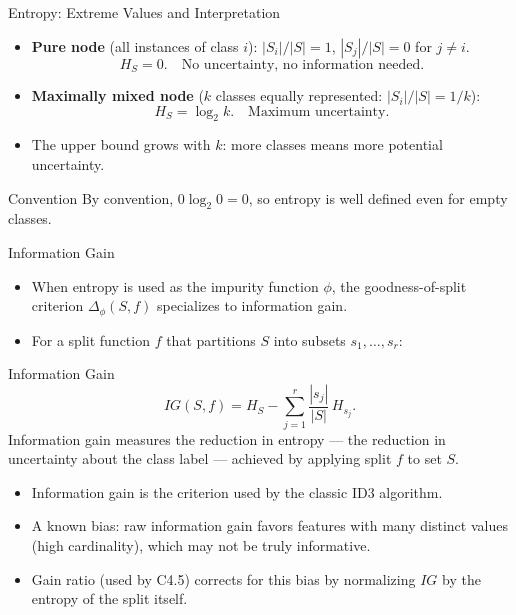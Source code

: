 \begin{frame}{Entropy: Extreme Values and Interpretation}
  \begin{itemize}
    \item \textbf{Pure node} (all instances of class $i$): $|S_i|/|S| = 1$, $|S_j|/|S| = 0$
          for $j \neq i$.
          \[
            H_S = 0. \quad \text{No uncertainty, no information needed.}
          \]
    \item \textbf{Maximally mixed node} ($k$ classes equally represented: $|S_i|/|S| = 1/k$):
          \[
            H_S = \log_2 k. \quad \text{Maximum uncertainty.}
          \]
    \item The upper bound grows with $k$: more classes means more potential uncertainty.
  \end{itemize}
  \begin{alertblock}{Convention}
    By convention, $0 \log_2 0 = 0$, so entropy is well defined even for empty classes.
  \end{alertblock}
\end{frame}

\begin{frame}{Information Gain}
  \begin{itemize}
    \item When entropy is used as the impurity function $\phi$, the goodness-of-split criterion
          $\Delta_\phi(S, f)$ specializes to \alert{information gain}.
    \item For a split function $f$ that partitions $S$ into subsets $s_1, \ldots, s_r$:
  \end{itemize}
  \begin{block}{Information Gain}
    \[
      IG(S, f) = H_S - \sum_{j=1}^{r} \frac{|s_j|}{|S|}\, H_{s_j}.
    \]
    Information gain measures the \alert{reduction in entropy} — the reduction in uncertainty about
    the class label — achieved by applying split $f$ to set $S$.
  \end{block}
  \begin{itemize}
    \item Information gain is the criterion used by the classic \alert{ID3} algorithm.
    \item A known bias: raw information gain favors features with \alert{many distinct values}
          (high cardinality), which may not be truly informative.
    \item \alert{Gain ratio} (used by C4.5) corrects for this bias by normalizing $IG$ by the
          entropy of the split itself.
  \end{itemize}
\end{frame}


